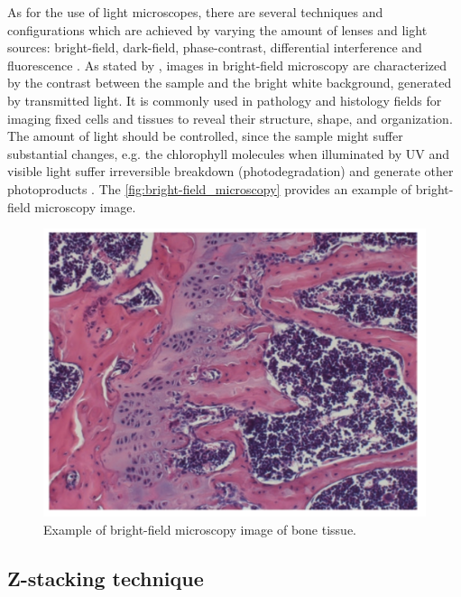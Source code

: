 As for the use of light microscopes, there are several techniques and configurations which are achieved by varying the amount of lenses and light sources: bright-field, dark-field, phase-contrast, differential interference and fluorescence \cite{roane2009microscopic}. As stated by , images in bright-field microscopy are characterized by the contrast between the sample and the bright white background, generated by transmitted light. It is commonly used in pathology and histology fields for imaging fixed cells and tissues to reveal their structure, shape, and organization. The amount of light should be controlled, since the sample might suffer substantial changes, e.g. the chlorophyll molecules when illuminated by UV and visible light suffer irreversible breakdown (photodegradation) and generate other photoproducts \cite{petrovic2017clorophyll}. The \autoref{fig:bright-field_microscopy} provides an example of bright-field microscopy image.

\begin{figure}[htb]
	\centering
	\caption{\label{fig:bright-field_microscopy} Example of bright-field microscopy image of bone tissue.}
	\begin{center}
	    \includegraphics[scale=0.25]{images/bright-field_microscopy.png}
	\end{center}
	\centering
\end{figure}

\subsection{Z-stacking technique}

